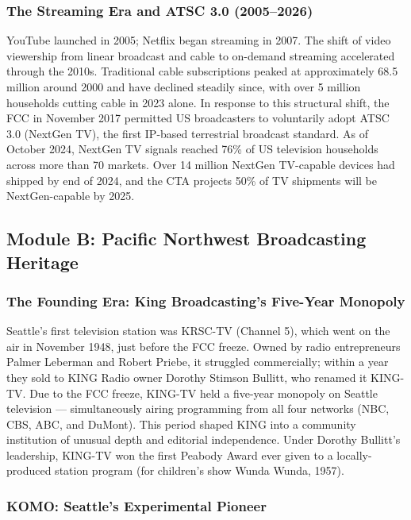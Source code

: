 \documentclass[11pt,letterpaper]{article}
\begin{document}
\subsubsection{The Streaming Era and ATSC 3.0 (2005--2026)}

YouTube launched in 2005; Netflix began streaming in 2007. The shift of video viewership from linear broadcast and cable to on-demand streaming accelerated through the 2010s. Traditional cable subscriptions peaked at approximately 68.5 million around 2000 and have declined steadily since, with over 5 million households cutting cable in 2023 alone. In response to this structural shift, the FCC in November 2017 permitted US broadcasters to voluntarily adopt ATSC 3.0 (NextGen TV), the first IP-based terrestrial broadcast standard. As of October 2024, NextGen TV signals reached 76\% of US television households across more than 70 markets. Over 14 million NextGen TV-capable devices had shipped by end of 2024, and the CTA projects 50\% of TV shipments will be NextGen-capable by 2025.

\subsection{Module B: Pacific Northwest Broadcasting Heritage}

\subsubsection{The Founding Era: King Broadcasting's Five-Year Monopoly}

Seattle's first television station was KRSC-TV (Channel 5), which went on the air in November 1948, just before the FCC freeze. Owned by radio entrepreneurs Palmer Leberman and Robert Priebe, it struggled commercially; within a year they sold to KING Radio owner Dorothy Stimson Bullitt, who renamed it KING-TV. Due to the FCC freeze, KING-TV held a five-year monopoly on Seattle television --- simultaneously airing programming from all four networks (NBC, CBS, ABC, and DuMont). This period shaped KING into a community institution of unusual depth and editorial independence. Under Dorothy Bullitt's leadership, KING-TV won the first Peabody Award ever given to a locally-produced station program (for children's show Wunda Wunda, 1957).

\subsubsection{KOMO: Seattle's Experimental Pioneer}
\end{document}
